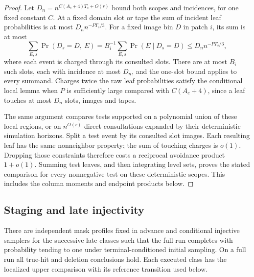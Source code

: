 \begin{proof}
Let \(D_n=n^{C(A_c+4)T_s+O(r)}\) bound both scopes and incidences,
for one fixed constant \(C\). At a fixed domain slot or tape the
sum of incident leaf probabilities is at most
\(D_n n^{-PT_s/3}\). For a fixed image bin \(D\) in patch \(i\),
its sum is at most
\[
 \sum_{E,s}\Pr(D_s=D,\ E)
 =B_i^{-1}\sum_{E,s}\Pr(E\mid D_s=D)
 \le D_n n^{-PT_s/3},
\]
where each event is charged through its consulted slots. There are
at most \(B_i\) such slots, each with incidence at most \(D_n\),
and the one-slot bound applies to every summand. Charges twice the
raw leaf probabilities satisfy the conditional local lemma when
\(P\) is sufficiently large compared with \(C(A_c+4)\), since a
leaf touches at most \(D_n\) slots, images and tapes.

The same argument compares tests supported on a polynomial union of
these local regions, or on \(n^{O(r)}\) direct consultations expanded
by their deterministic simulation horizons. Split a test event by its
consulted slot images. Each resulting leaf has the same nonneighbor
property; the sum of touching charges is \(o(1)\). Dropping those
constraints therefore costs a reciprocal avoidance product \(1+o(1)\).
Summing test leaves, and then integrating level sets, proves the
stated comparison for every nonnegative test on these deterministic
scopes. This includes the column moments and endpoint products below.
\end{proof}

\subsection{Staging and late injectivity}
\label{sec:staging-and-late-injectivity}

\begin{proposition}\label{prop:late-assignment}
There are independent mask profiles fixed in advance and conditional injective samplers for the successive late classes such that the full run completes with probability tending to one under terminal-conditioned initial sampling. On a full run all true-hit and deletion conclusions hold. Each executed class has the localized upper comparison with its reference transition used below.
\end{proposition}

